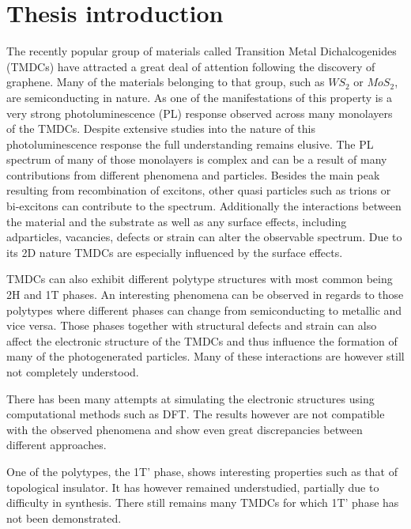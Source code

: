 \chapter{Thesis introduction}

The recently popular group of materials called Transition Metal Dichalcogenides (TMDCs) have attracted a great deal of attention following the discovery of graphene. Many of the materials belonging to that group, such as $WS_2$ or $MoS_2$, are semiconducting in nature. As one of the manifestations of this property is a very strong photoluminescence (PL) response observed across many monolayers of the TMDCs. Despite extensive studies into the nature of this photoluminescence response the full understanding remains elusive. The PL spectrum of many of those monolayers is complex and can be a result of many contributions from different phenomena and particles. Besides the main peak resulting from recombination of excitons, other quasi particles such as trions or bi-excitons can contribute to the spectrum. Additionally the interactions between the material and the substrate as well as any surface effects, including adparticles, vacancies, defects or strain can alter the observable spectrum. Due to its 2D nature TMDCs are especially influenced by the surface effects. 

TMDCs can also exhibit different polytype structures with most common being 2H and 1T phases. An interesting phenomena can be observed in regards to those polytypes where different phases can change from semiconducting to metallic and vice versa. Those phases together with structural defects and strain can also affect the electronic structure of the TMDCs and thus influence the formation of many of the photogenerated particles. Many of these interactions are however still not completely understood. 

There has been many attempts at simulating the electronic structures using computational methods such as DFT. The results however are not compatible with the observed phenomena and show even great discrepancies between different approaches.

One of the polytypes, the 1T' phase, shows interesting properties such as that of topological insulator. It has however remained understudied, partially due to difficulty in synthesis. There still remains many TMDCs for which 1T' phase has not been demonstrated.

